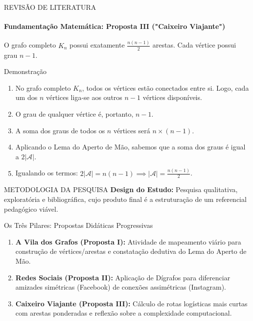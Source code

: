\documentclass[10pt, aspectratio=169]{beamer}
\begin{document}
\begin{frame}{REVISÃO DE LITERATURA}
  \framesubtitle{Fundamentação Matemática: Proposta III ("Caixeiro Viajante")}
  \begin{tcolorbox}[colback=white, colframe=uescgreen, title=Teorema 3.1: Arestas no Grafo Completo]
    O grafo completo $K_n$ possui exatamente $\frac{n(n-1)}{2}$ arestas. Cada vértice possui grau $n-1$.
  \end{tcolorbox}
  
  \vspace{0.1cm}
  
  \begin{block}{Demonstração}
    \begin{enumerate}
        \item No grafo completo $K_n$, todos os vértices estão conectados entre si. Logo, cada um dos $n$ vértices liga-se aos outros $n-1$ vértices disponíveis.
        \item O grau de qualquer vértice é, portanto, $n-1$.
        \item A soma dos graus de todos os $n$ vértices será $n \times (n-1)$.
        \item Aplicando o Lema do Aperto de Mão, sabemos que a soma dos graus é igual a $2|\mathcal{A}|$.
        \item Igualando os termos: $2|\mathcal{A}| = n(n-1) \implies |\mathcal{A}| = \frac{n(n-1)}{2}$. \qedsymbol
    \end{enumerate}
  \end{block}
\end{frame}

\begin{frame}{METODOLOGIA DA PESQUISA}
  \textbf{Design do Estudo:} Pesquisa qualitativa, exploratória e bibliográfica, cujo produto final é a estruturação de um referencial pedagógico viável.
  
  \vspace{0.4cm}
  
  \begin{block}{Os Três Pilares: Propostas Didáticas Progressivas}
    \begin{enumerate}
      \item \textbf{A Vila dos Grafos (Proposta I):} Atividade de mapeamento viário para construção de vértices/arestas e constatação dedutiva do Lema do Aperto de Mão.
      \item \textbf{Redes Sociais (Proposta II):} Aplicação de Dígrafos para diferenciar amizades simétricas (Facebook) de conexões assimétricas (Instagram).
      \item \textbf{Caixeiro Viajante (Proposta III):} Cálculo de rotas logísticas mais curtas com arestas ponderadas e reflexão sobre a complexidade computacional.
    \end{enumerate}
  \end{block}
\end{frame}
\end{document}
